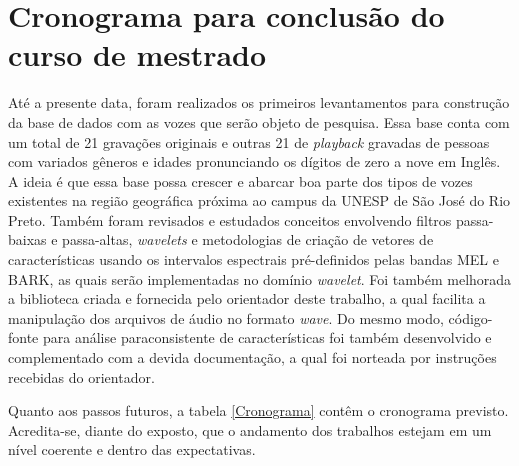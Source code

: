 \documentclass[a4paper,12pt,openright,oneside]{book}
\newenvironment{myenv}[1]
{\begin{spacing}{#1}}
	{\end{spacing}}
\begin{document}
\chapter{Cronograma para conclusão do curso de mestrado}
\begin{myenv}{1.5}
\par Até a presente data, foram realizados os primeiros levantamentos para construção da base de dados com as vozes que serão objeto de pesquisa. Essa base conta com um total de 21 gravações originais e outras 21 de \textit{playback} gravadas de pessoas com variados gêneros e idades pronunciando os dígitos de zero a nove em Inglês. A ideia é que essa base possa crescer e abarcar boa parte dos tipos de vozes existentes na região geográfica próxima ao campus da UNESP de São José do Rio Preto. Também foram revisados e estudados conceitos envolvendo filtros passa-baixas e passa-altas, \textit{wavelets} e metodologias de criação de vetores de características usando os intervalos espectrais pré-definidos pelas bandas MEL e BARK, as quais serão implementadas no domínio \textit{wavelet}. Foi também melhorada a biblioteca criada e fornecida pelo orientador deste trabalho, a qual facilita a manipulação dos arquivos de áudio no formato \textit{wave}. Do mesmo modo, código-fonte para análise paraconsistente de características foi também desenvolvido e complementado com a devida documentação, a qual foi norteada por instruções recebidas do orientador.
\\
\par Quanto aos passos futuros, a tabela \ref{Cronograma} contêm o cronograma previsto. Acredita-se, diante do exposto, que o andamento dos trabalhos estejam em um nível coerente e dentro das expectativas.

			\newcommand\ytl[2]{
	\parbox[b]{10em}{
		\hfill{\color{black}\bfseries\sffamily #1}~$\cdots\cdots$~
	}
	\makebox[0pt][c]{
		$\bullet$
	}\vrule\quad \parbox[c]{4.5cm}{
		\vspace{7pt}\color{black}\raggedright\sffamily #2.\\[7pt]
	}\\
	[-3pt]
}


\end{myenv}
\end{document}
